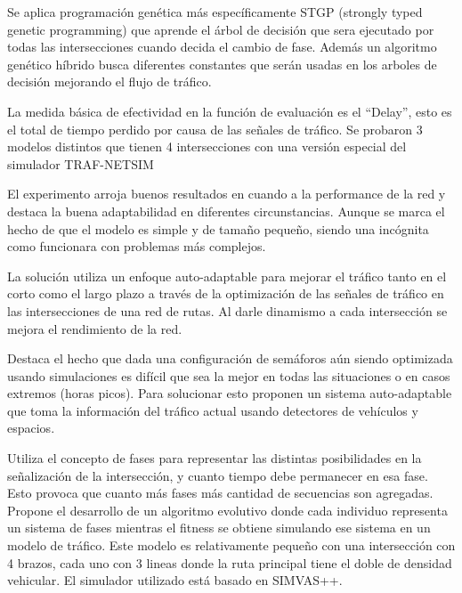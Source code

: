 \begin{itemize}
\begin{item}
Se aplica programación genética más específicamente STGP (strongly typed genetic programming) \citep{Montana1995} que aprende el árbol de decisión que sera ejecutado por todas las intersecciones cuando decida el cambio de fase. Además un algoritmo genético híbrido busca diferentes constantes que serán usadas en los arboles de decisión mejorando el flujo de tráfico.

La medida básica de efectividad en la función de evaluación es el “Delay”, esto es el total de tiempo perdido por causa de las señales de tráfico. Se probaron 3 modelos distintos que tienen 4 intersecciones con una versión especial del simulador  TRAF-NETSIM \citep{TRAF-NETSIM}

El experimento arroja buenos resultados en cuando a la performance de la red y destaca la buena adaptabilidad en diferentes circunstancias. Aunque se marca el hecho de que el modelo es simple y de tamaño pequeño, siendo una incógnita como funcionara con problemas más complejos.
	
	\end{item}	


	\begin{item}

La solución utiliza un enfoque auto-adaptable para mejorar el tráfico tanto en el corto como el largo plazo a través de la optimización de las señales de tráfico en las intersecciones de una red de rutas. Al darle dinamismo a cada intersección se mejora el rendimiento de la red.

Destaca el hecho que dada una configuración de semáforos aún siendo optimizada usando simulaciones es difícil que sea la mejor en todas las situaciones o en casos extremos (horas picos). Para solucionar esto proponen un sistema auto-adaptable que toma la información del tráfico actual usando detectores de vehículos y espacios.

Utiliza el concepto de fases para representar las distintas posibilidades en la señalización de la intersección, y cuanto tiempo debe permanecer en esa fase. Esto provoca que cuanto más fases más cantidad de secuencias son agregadas.
Propone el desarrollo de un algoritmo evolutivo donde cada individuo representa un sistema de fases mientras el fitness se obtiene simulando ese sistema en un modelo de tráfico. Este modelo es relativamente pequeño con una intersección con 4 brazos, cada uno con 3 lineas donde la ruta principal tiene el doble de densidad vehicular. El simulador utilizado está basado en SIMVAS++.


\end{item}
\end{itemize}
